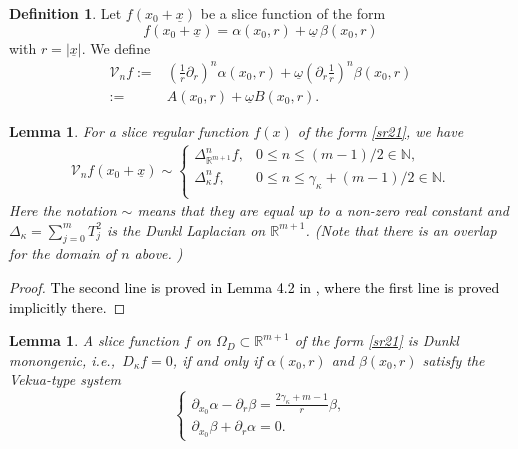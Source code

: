 \documentclass{amsart}
\newtheorem{lemma}[theorem]{Lemma}
\theoremstyle{definition}
\newtheorem{definition}[theorem]{Definition}
\theoremstyle{remark}
\numberwithin{equation}{section}
\begin{document}
\begin{definition} \label{defi41} Let $f(x_{0}+\underline{x})$ be a slice  function of the form
\begin{equation}\label{sr21}
    f(x_{0}+\underline{x})=\alpha(x_{0}, r)+\underline{\omega}\, \beta(x_{0}, r)
\end{equation}
with $r=|\underline{x}|$.
We define
\begin{equation*}
\begin{split}
    \mathcal{V}_{n}f:=&\left(\frac{1}{r}\partial_{r}\right)^{n}\alpha(x_{0}, r)+\underline{\omega}\left(\partial_{r}\frac{1}{r}\right)^{n}\beta(x_{0}, r)\\
    :=& A(x_{0}, r)+\underline{\omega} B(x_{0}, r).
\end{split}
\end{equation*}
\end{definition}
\begin{lemma} \cite{fck} For a slice regular function $f(x)$ of the form \eqref{sr21}, we have
\begin{equation*}
    		\begin{split}
    			\mathcal{V}_{n}f(x_{0}+\underline{x})\sim \left\{
    			\begin{array}{ll}
    				  \Delta_{\mathbb{R}^{m+1}}^{n} f , & 0\le  n\le (m-1)/2\in \mathbb{N},\\
    				\Delta_{\kappa}^{n}f, & 0\le  n\le \gamma_{\kappa}+(m-1)/2\in \mathbb{N}.\\
    			\end{array}
    			\right.
    		\end{split}
\end{equation*}
Here the notation $\sim$ means that they are equal up to a non-zero real constant and $\Delta_{\kappa}=\sum_{j=0}^{m}T_{j}^{2}$ is the Dunkl Laplacian on $\mathbb{R}^{m+1}$.  (Note that there is an overlap for the domain of $n$ above. )
\end{lemma}
\begin{proof}
 \textcolor{black}{The second line is proved in  Lemma 4.2 in \cite{fck}, where the first line is proved implicitly there.}
\end{proof}

\begin{lemma} \cite{fck} \label{fg1} A slice function  $f$ on $\Omega_{D}\subset \mathbb{R}^{m+1}$ of the form  \eqref{sr21}
 is Dunkl monongenic, i.e., \,$D_{\kappa}f=0$,  if and only if $\alpha(x_{0}, r)$ and $\beta(x_{0}, r)$ satisfy the Vekua-type system
\begin{equation*}
    \left\{
  \begin{array}{ll}
    \partial_{x_{0}}\alpha-\partial_{r}\beta=\displaystyle \frac{2\gamma_{\kappa}+m-1}{r} \beta, \\
   \partial_{x_{0}}\beta+\partial_{r}\alpha=0.
  \end{array}
\right.
\end{equation*}
\end{lemma}
\end{document}

